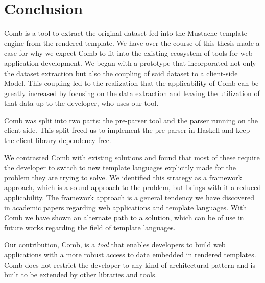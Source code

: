 \documentclass[thesis.tex]{subfiles}
\begin{document}
\chapter{Conclusion}
\label{chap:conclusion}
Comb is a tool to extract the original dataset fed into the Mustache template
engine from the rendered template. We have over the course of this thesis made a
case for why we expect Comb to fit into the existing ecosystem of tools for web
application development. We began with a prototype that incorporated not only
the dataset extraction but also the coupling of said dataset to a client-side
Model.
This coupling led to the realization that the applicability of Comb can be
greatly increased by focusing on the data extraction and leaving the utilization
of that data up to the developer, who uses our tool.

Comb was split into two parts: the pre-parser tool and the parser running on
the client-side. This split freed us to implement the pre-parser in Haskell
and keep the client library dependency free.

We contrasted Comb with existing solutions and found that most of these require
the developer to switch to new template languages explicitly made for the
problem they are trying to solve. We identified this strategy as a framework
approach, which is a sound approach to the problem, but brings with it a reduced
applicability. The framework approach is a general tendency we have discovered
in academic papers regarding web applications and template languages. With
Comb we have shown an alternate path to a solution, which can be of use in
future works regarding the field of template languages.

Our contribution, Comb, is a \emph{tool} that enables developers to
build web applications with a more robust access to data embedded in rendered
templates. Comb does not restrict the developer to any kind of architectural
pattern and is built to be extended by other libraries and tools.
\end{document}
